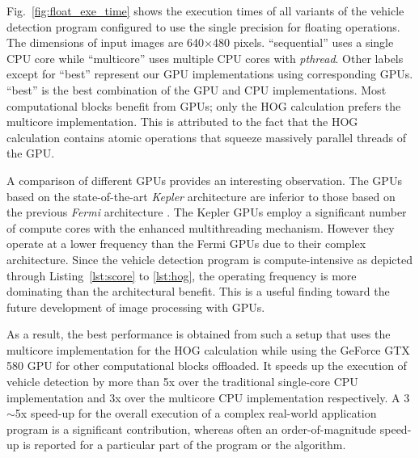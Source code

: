 Fig.~\ref{fig:float_exe_time} shows the execution times of all variants
of the vehicle detection program configured to use the single precision
for floating operations.
The dimensions of input images are 640$\times$480 pixels.
``sequential'' uses a single CPU core while ``multicore'' uses multiple
CPU cores with \textit{pthread}.
Other labels except for ``best'' represent our GPU implementations using
corresponding GPUs.
``best'' is the best combination of the GPU and CPU implementations.
Most computational blocks benefit from GPUs; only the HOG calculation
prefers the multicore implementation.
This is attributed to the fact that the HOG calculation contains atomic
operations that squeeze massively parallel threads of the GPU.

A comparison of different GPUs provides an interesting observation.
The GPUs based on the state-of-the-art \textit{Kepler}
architecture \cite{NVIDIA_Kepler} are inferior to those based on the
previous \textit{Fermi} architecture \cite{NVIDIA_Fermi}.
The Kepler GPUs employ a significant number of compute cores with the
enhanced multithreading mechanism.
However they operate at a lower frequency than the Fermi GPUs due to
their complex architecture.
Since the vehicle detection program is compute-intensive as depicted
through Listing~\ref{lst:score} to \ref{lst:hog}, the operating 
frequency is more dominating than the architectural benefit.
This is a useful finding toward the future development of image
processing with GPUs.

As a result, the best performance is obtained from such a setup that
uses the multicore implementation for the HOG calculation while using
the GeForce GTX 580 GPU for other computational blocks offloaded.
It speeds up the execution of vehicle detection by more than 5x over the
traditional single-core CPU implementation and 3x over the multicore CPU
implementation respectively. 
A 3$\sim$5x speed-up for the overall execution of a complex real-world
application program is a significant contribution, whereas often an
order-of-magnitude speed-up is reported for a particular part of the
program or the algorithm.

